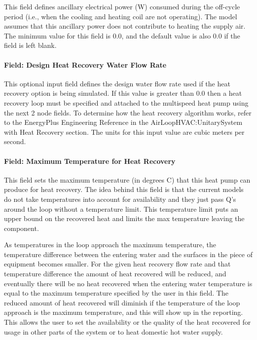 This field defines ancillary electrical power (W) consumed during the off-cycle period (i.e., when the cooling and heating coil are not operating). The model assumes that this ancillary power does not contribute to heating the supply air. The minimum value for this field is 0.0, and the default value is also 0.0 if the field is left blank.

\paragraph{Field: Design Heat Recovery Water Flow Rate}\label{field-design-heat-recovery-water-flow-rate-001}

This optional input field defines the design water flow rate used if the heat recovery option is being simulated. If this value is greater than 0.0 then a heat recovery loop must be specified and attached to the multispeed heat pump using the next 2 node fields. To determine how the heat recovery algorithm works, refer to the EnergyPlus Engineering Reference in the AirLoopHVAC:UnitarySystem with Heat Recovery section. The units for this input value are cubic meters per second.

\paragraph{Field: Maximum Temperature for Heat Recovery}\label{field-maximum-temperature-for-heat-recovery}

This field sets the maximum temperature (in degrees C) that this heat pump can produce for heat recovery. The idea behind this field is that the current models do not take temperatures into account for availability and they just pass Q's around the loop without a temperature limit. This temperature limit puts an upper bound on the recovered heat and limits the max temperature leaving the component.

As temperatures in the loop approach the maximum temperature, the temperature difference between the entering water and the surfaces in the piece of equipment becomes smaller. For the given heat recovery flow rate and that temperature difference the amount of heat recovered will be reduced, and eventually there will be no heat recovered when the entering water temperature is equal to the maximum temperature specified by the user in this field. The reduced amount of heat recovered will diminish if the temperature of the loop approach is the maximum temperature, and this will show up in the reporting. This allows the user to set the availability or the quality of the heat recovered for usage in other parts of the system or to heat domestic hot water supply.

